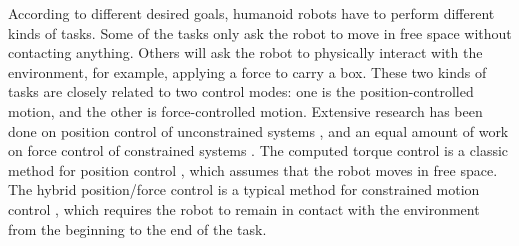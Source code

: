 
According to different desired goals, humanoid robots have to perform different kinds of tasks. Some of the tasks only ask the robot to move in free space without contacting anything. Others will ask the robot to physically interact with the environment, for example, applying a force to carry a box. These two kinds of tasks are closely related to two control modes: one is the position-controlled motion, and the other is force-controlled motion. Extensive research has been done on position control of unconstrained systems \cite{an1988,de2012}, and an equal amount of work on force control of constrained systems \cite{whitney1987,siciliano2012}. The computed torque control is a classic method for position control \cite{slotine1991,isidori1995}, which assumes that the robot moves in free space. The hybrid position/force control is a typical method for constrained motion control \cite{raibert1981,khatib1987,yoshikawa1988}, which requires the robot to remain in contact with the environment from the beginning to the end of the task. 


